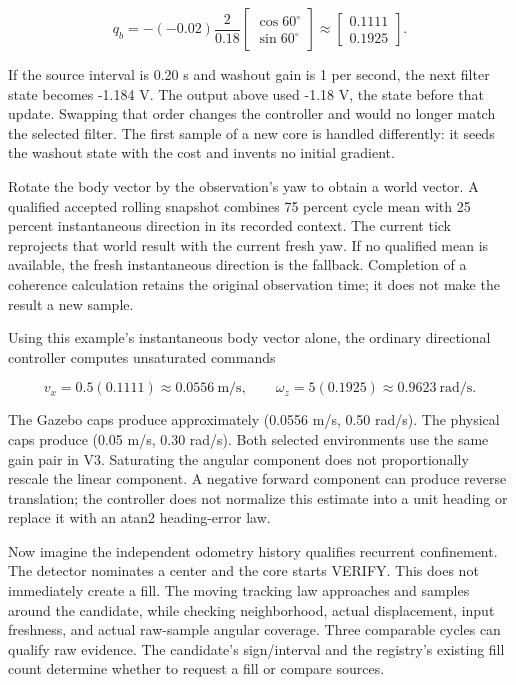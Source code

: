 \documentclass[
  10pt,
  letterpaper,
]{article}
\begin{document}
\[
q_b=-(-0.02)\frac{2}{0.18}
\begin{bmatrix}\cos60^\circ\\\sin60^\circ\end{bmatrix}
\approx\begin{bmatrix}0.1111\\0.1925\end{bmatrix}.
\]

If the source interval is 0.20 s and washout gain is 1 per second, the
next filter state becomes -1.184 V. The output above used -1.18 V, the
state before that update. Swapping that order changes the controller and
would no longer match the selected filter. The first sample of a new
core is handled differently: it seeds the washout state with the cost
and invents no initial gradient.

Rotate the body vector by the observation's yaw to obtain a world
vector. A qualified accepted rolling snapshot combines 75 percent cycle
mean with 25 percent instantaneous direction in its recorded context.
The current tick reprojects that world result with the current fresh
yaw. If no qualified mean is available, the fresh instantaneous
direction is the fallback. Completion of a coherence calculation retains
the original observation time; it does not make the result a new sample.

Using this example's instantaneous body vector alone, the ordinary
directional controller computes unsaturated commands

\[
v_x=0.5(0.1111)\approx0.0556\ \mathrm{m/s},\qquad
\omega_z=5(0.1925)\approx0.9623\ \mathrm{rad/s}.
\]

The Gazebo caps produce approximately (0.0556 m/s, 0.50 rad/s). The
physical caps produce (0.05 m/s, 0.30 rad/s). Both selected environments
use the same gain pair in V3. Saturating the angular component does not
proportionally rescale the linear component. A negative forward
component can produce reverse translation; the controller does not
normalize this estimate into a unit heading or replace it with an atan2
heading-error law.

Now imagine the independent odometry history qualifies recurrent
confinement. The detector nominates a center and the core starts VERIFY.
This does not immediately create a fill. The moving tracking law
approaches and samples around the candidate, while checking
neighborhood, actual displacement, input freshness, and actual
raw-sample angular coverage. Three comparable cycles can qualify raw
evidence. The candidate's sign/interval and the registry's existing fill
count determine whether to request a fill or compare sources.
\end{document}
